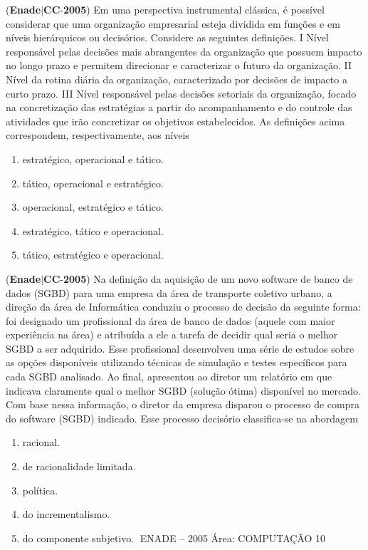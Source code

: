 \documentclass{exam}
\begin{document}
\begin{questions}
\question (\textbf{Enade}$|$\textbf{CC}-\textbf{2005}) Em uma perspectiva instrumental clássica, é possível considerar
que uma organização empresarial esteja dividida em funções e em
níveis hierárquicos ou decisórios. Considere as seguintes
definições.
I Nível responsável pelas decisões mais abrangentes da
organização que possuem impacto no longo prazo e permitem
direcionar e caracterizar o futuro da organização.
II Nível da rotina diária da organização, caracterizado por
decisões de impacto a curto prazo.
III Nível responsável pelas decisões setoriais da organização,
focado na concretização das estratégias a partir do
acompanhamento e do controle das atividades que irão
concretizar os objetivos estabelecidos.
As definições acima correspondem, respectivamente, aos níveis
	\begin{enumerate}[label=\alph*)]
		\item  estratégico, operacional e tático.
		\item  tático, operacional e estratégico.
		\item  operacional, estratégico e tático.
		\item  estratégico, tático e operacional.
		\item  tático, estratégico e operacional.

	\end{enumerate}

\question (\textbf{Enade}$|$\textbf{CC}-\textbf{2005}) Na definição da aquisição de um novo software de
banco de dados (SGBD) para uma empresa da área de
transporte coletivo urbano, a direção da área de Informática
conduziu o processo de decisão da seguinte forma: foi
designado um profissional da área de banco de dados (aquele
com maior experiência na área) e atribuída a ele a tarefa de
decidir qual seria o melhor SGBD a ser adquirido. Esse
profissional desenvolveu uma série de estudos sobre as opções
disponíveis utilizando técnicas de simulação e testes específicos
para cada SGBD analisado. Ao final, apresentou ao diretor
um relatório em que indicava claramente qual o melhor SGBD
(solução ótima) disponível no mercado. Com base nessa
informação, o diretor da empresa disparou o processo de
compra do software (SGBD) indicado.
Esse processo decisório classifica-se na abordagem
	\begin{enumerate}[label=\alph*)]
		\item  racional.
		\item  de racionalidade limitada.
		\item  política.
		\item  do incrementalismo.
		\item  do componente subjetivo.
ENADE – 2005 Área: COMPUTAÇÃO 10


\end{enumerate}
\end{questions}
\end{document}
